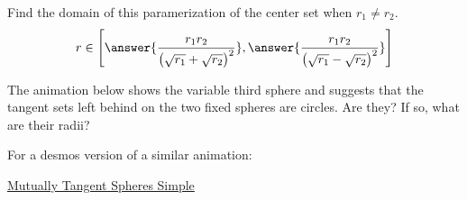 \documentclass{ximera}
\begin{document}
\begin{question}  \label{Qgt4667:Spheres}

Find the domain of this paramerization of the center set when $r_1\neq r_2$. 
\[
           r \in \left[ \answer{\frac{r_1 r_2}{\left(\sqrt{r_1}+\sqrt{r_2}\right)^2}} ,    \answer{\frac{r_1 r_2}{\left(\sqrt{r_1}-\sqrt{r_2}\right)^2}} \right]                 
\]  

\end{question}

The animation below shows the variable third sphere and suggests that the tangent sets left behind on the two fixed spheres are circles. Are they? If so, what are their radii?



 
\begin{onlineOnly}
    \begin{center}
\end{center}
\end{onlineOnly}


For a desmos version of a similar animation:

\href{https://www.desmos.com/3d/89832f7500}{Mutually Tangent Spheres Simple}
\end{document}

